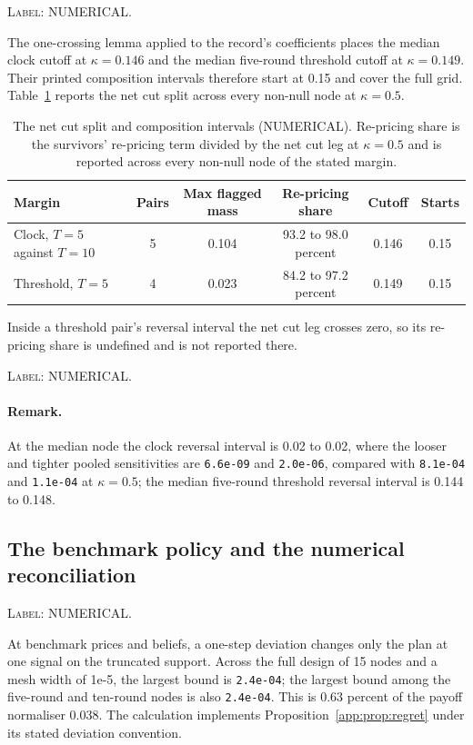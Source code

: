 \documentclass[11pt]{article}
\begin{document}
\noindent\textsc{Label: NUMERICAL.}\par
The one-crossing lemma applied to the record's coefficients places the median clock cutoff at
$\kappa=0.146$ and the median five-round threshold cutoff at $\kappa=0.149$. Their printed
composition intervals therefore start at 0.15 and cover the full grid. Table~\ref{tab:cut-split}
reports the net cut split across every non-null node at $\kappa=0.5$.

\begin{table}[H]
\centering
\caption{The net cut split and composition intervals (NUMERICAL). Re-pricing share is the
survivors' re-pricing term divided by the net cut leg at $\kappa=0.5$ and is reported across every
non-null node of the stated margin.}
\label{tab:cut-split}
\small
\begin{tabular}{lccccc}
\toprule
Margin & Pairs & Max flagged mass & Re-pricing share & Cutoff & Starts \\
\midrule
Clock, $T=5$ against $T=10$ & 5 & 0.104 & 93.2 to 98.0 percent & 0.146 & 0.15 \\
Threshold, $T=5$ & 4 & 0.023 & 84.2 to 97.2 percent & 0.149 & 0.15 \\
\bottomrule
\end{tabular}
\end{table}

Inside a threshold pair's reversal interval the net cut leg crosses zero, so its re-pricing share
is undefined and is not reported there.

\noindent\textsc{Label: NUMERICAL.}\par
\paragraph{Remark.} At the median node the clock reversal interval is 0.02 to 0.02, where the
looser and tighter pooled sensitivities are \texttt{6.6e-09} and \texttt{2.0e-06}, compared with
\texttt{8.1e-04} and \texttt{1.1e-04} at $\kappa=0.5$; the median five-round threshold reversal
interval is 0.144 to 0.148.

\subsection{The benchmark policy and the numerical reconciliation}

\noindent\textsc{Label: NUMERICAL.}\par
At benchmark prices and beliefs, a one-step deviation changes only the plan at one signal on the
truncated support. Across the full design of 15 nodes and a mesh width of 1e-5, the largest bound is
\texttt{2.4e-04}; the largest bound among the five-round and ten-round nodes is also
\texttt{2.4e-04}. This is 0.63 percent of the payoff normaliser 0.038. The calculation implements
Proposition~\ref{app:prop:regret} under its stated deviation convention.
\end{document}
